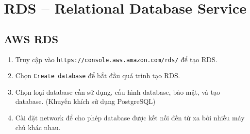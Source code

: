 \section{RDS -- Relational Database Service}
\subsection{AWS RDS}
\begin{enumerate}
\item Truy cập vào \texttt{https://console.aws.amazon.com/rds/} để tạo RDS.
\item Chọn \texttt{Create database} để bắt đầu quá trình tạo RDS.
\item Chọn loại database cần sử dụng, cấu hình database, bảo mật, và tạo database. (Khuyến khích sử dụng PostgreSQL)
\item Cài đặt network để cho phép database được kết nối đến từ xa bởi nhiều máy chủ khác nhau.
\end{enumerate}

